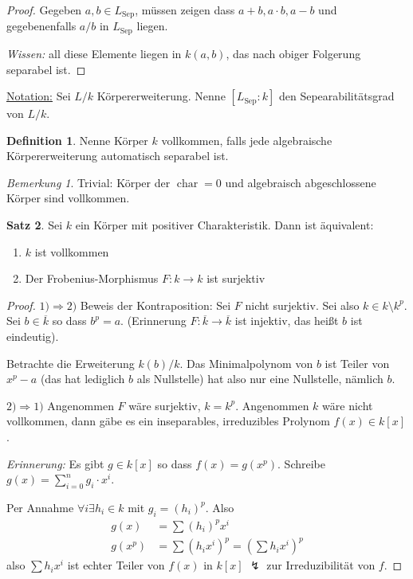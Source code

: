\documentclass[12pt,parskip=full]{scrartcl}
\newcommand{\heading}{\underline}
\theoremstyle{definition}
\newtheorem{theorem}{Satz}[section]
\newtheorem{definition}[theorem]{Definition}
\theoremstyle{remark}
\newtheorem*{remark}{Bemerkung}
\begin{document}
	\begin{proof}
		Gegeben $a,b \in L_\text{Sep}$, müssen zeigen dass $a + b, a \cdot b, a - b$ und gegebenenfalls $a/b$ in $L_\text{Sep}$ liegen.
		
		\textit{Wissen:} all diese Elemente liegen in $k(a,b)$, das nach obiger Folgerung separabel ist.
	\end{proof}

	\heading{Notation:} Sei $L/k$ Körpererweiterung. Nenne $[L_\text{Sep}: k]$ den Sepearabilitätsgrad von $L/k$.
	
	\begin{definition}
		Nenne Körper $k$ vollkommen, falls jede algebraische Körpererweiterung automatisch separabel ist.
	\end{definition}

	\begin{remark}
		Trivial: Körper der $\operatorname{char} = 0$ und algebraisch abgeschlossene Körper sind vollkommen.
	\end{remark}

	\begin{theorem}
		Sei $k$ ein Körper mit positiver Charakteristik. Dann ist äquivalent:
		\begin{enumerate}
			\item $k$ ist vollkommen
			\item Der Frobenius-Morphismus $F: k \to k$ ist surjektiv
		\end{enumerate}
	\end{theorem}
	\begin{proof}
		\heading{$1) \Rightarrow 2)$} Beweis der Kontraposition: Sei $F$ nicht surjektiv. Sei also $k \in k \setminus k^p$. Sei $b \in \overline{k}$ so dass $b^p = a$. (Erinnerung $F: \overline{k} \to \overline{k}$ ist injektiv, das heißt $b$ ist eindeutig).
		
		Betrachte die Erweiterung $k(b)/k$. Das Minimalpolynom von $b$ ist Teiler von $x^p - a$ (das hat lediglich $b$ als Nullstelle) hat also nur eine Nullstelle, nämlich $b$.
		
		\heading{$2) \Rightarrow 1)$} Angenommen $F$ wäre surjektiv, $k = k^p$. Angenommen $k$ wäre nicht vollkommen, dann gäbe es ein inseparables, irreduzibles Prolynom $f(x) \in k[x]$.
		
		\textit{Erinnerung:} Es gibt $g \in k[x]$ so dass $f(x) = g(x^p)$. Schreibe $g(x) = \sum_{i=0}^n g_i \cdot x^i$.
		
		Per Annahme $\forall i \exists h_i \in k$ mit $g_i = (h_i)^p$. Also
		\begin{align*}
			g(x) &= \sum (h_i)^p x^i \\
			g(x^p) &= \sum (h_i x^i)^p = \left( \sum h_i x^i \right)^p
		\end{align*}
		also $\sum h_i x^i$ ist echter Teiler von $f(x)$ in $k[x]$ $\lightning$ zur Irreduzibilität von $f$.
	\end{proof}
\end{document}
